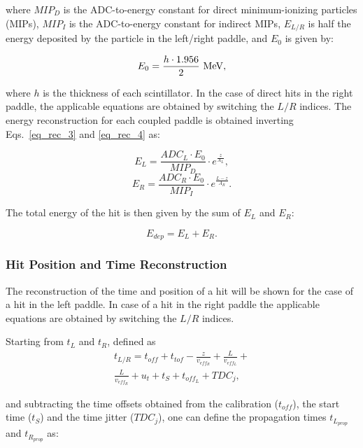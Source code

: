\noindent
where $MIP_D$ is the ADC-to-energy constant for direct minimum-ionizing particles (MIPs), $MIP_I$ is the
ADC-to-energy constant for indirect MIPs, $E_{L/R}$ is half the energy deposited by the particle in the
left/right paddle, and $E_0$ is given by:

\begin{equation}
\label{eq_def_e0}
E_0=\frac{h\cdot 1.956}{2}~{\rm MeV},
\end{equation}

\noindent
where $h$ is the thickness of each scintillator. In the case of direct hits in the right paddle, the applicable equations
are obtained by switching the $L/R$ indices. The energy reconstruction for each coupled paddle is obtained inverting
Eqs.~\ref{eq_rec_3} and \ref{eq_rec_4} as:

\begin{equation}
E_L = \frac{ADC_L \cdot E_0}{MIP_D} \cdot e^{\frac{z}{A_L}},
\end{equation}
\begin{equation}
E_R = \frac{ADC_R \cdot E_0}{MIP_I} \cdot e^{\frac{L-z}{A_R}}.
\end{equation}

\noindent
The total energy of the hit is then given by the sum of $E_L$ and $E_R$:

\begin{equation}
E_{dep} = E_L + E_R.
\end{equation}

\subsubsection{Hit Position and Time Reconstruction}

The reconstruction of the time and position of a hit will be shown for the case of a hit in the left paddle. In case
of a hit in the right paddle the applicable equations are obtained by switching the $L/R$ indices.

Starting from $t_L$ and $t_R$, defined as
\begin{multline}
\label{eq_time_hit}
t_{L/R} = t_{off} + t_{tof} - \frac{z}{v_{{eff}_R}} + \frac{L}{v_{{eff_L}}} + \\
\frac{L}{v_{eff_R}} + u_t + t_S + t_{{off}_L} + TDC_j,
\end{multline}

\noindent
and subtracting the time offsets obtained from the calibration ($t_{off}$), the start time ($t_S$) and the time
jitter ($TDC_j$), one can define the propagation times $t_{L_{prop}}$ and $t_{R_{prop}}$ as:

